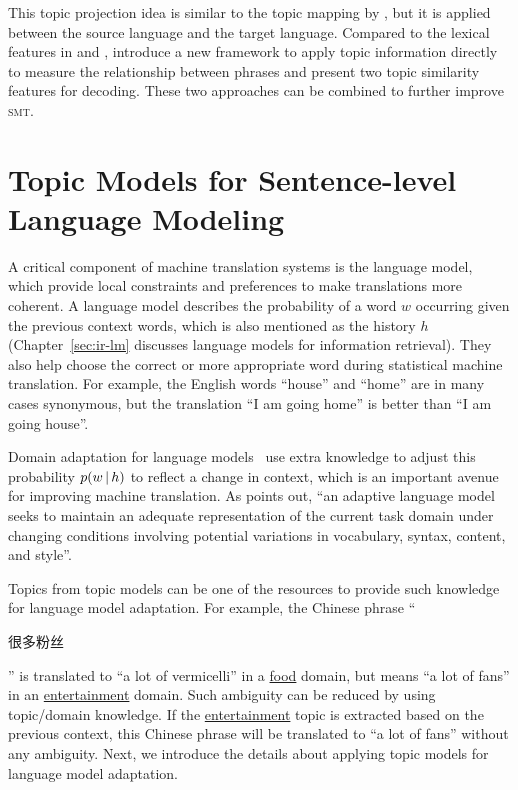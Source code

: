 This topic projection idea is similar to the topic mapping by
\citet{su-12}, but it is applied between the source language and the
target language. Compared to the lexical features in
\citet{Eidelman-12} and \citet{hu-14}, \citet{xiao-12} introduce a new
framework to apply topic information directly to measure the relationship between phrases and present two topic similarity features for decoding. These two approaches can
be combined to further improve \textsc{smt}.

\section{Topic Models for Sentence-level Language Modeling}


A critical component of machine translation systems is the language
model, which provide local constraints and preferences to make
translations more coherent. A language model describes the probability
of a word $w$ occurring given the previous context words, which is
also mentioned as the history $h$ (Chapter~\ref{sec:ir-lm} discusses
language models for information retrieval). They also help choose the
correct or more appropriate word during statistical machine
translation. For example, the English words ``house'' and ``home'' are
in many cases synonymous, but the translation ``I am going home'' is
better than ``I am going house''.

Domain adaptation for language models~\citep{Bellegarda-04,wood-09}
use extra knowledge to adjust this probability $p(w \, | \, h)$ to reflect
a change in context, which is an important avenue for improving machine
translation. As \citet{Bellegarda-04} points out, ``an adaptive
language model seeks to maintain an adequate representation of the
current task domain under changing conditions involving potential
variations in vocabulary, syntax, content, and style''.

Topics from topic models can be one of the resources to provide such
knowledge for language model adaptation. For example, the Chinese
phrase ``\begin{CJK*}{UTF8}{gbsn}很多粉丝\end{CJK*}'' is translated to
  ``a lot of vermicelli'' in a \underline{food} domain, but means ``a
  lot of fans'' in an \underline{entertainment} domain. Such ambiguity
  can be reduced by using topic/domain knowledge. If the \underline{entertainment} topic is extracted based on
  the previous context, this Chinese phrase will be translated to ``a
  lot of fans'' without any ambiguity. Next, we introduce the details
  about applying topic models for language model adaptation.

